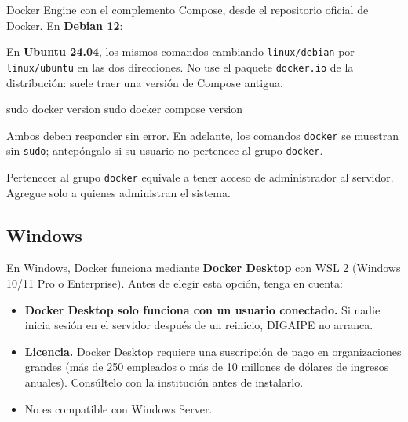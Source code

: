 Docker Engine con el complemento Compose, desde el repositorio oficial de Docker. En
\textbf{Debian 12}:


En \textbf{Ubuntu 24.04}, los mismos comandos cambiando \texttt{linux/debian} por
\texttt{linux/ubuntu} en las dos direcciones. No use el paquete \texttt{docker.io} de la
distribución: suele traer una versión de Compose antigua.

\begin{comprobar}
	\begin{codigo}
sudo docker version
sudo docker compose version
	\end{codigo}
	Ambos deben responder sin error. En adelante, los comandos \texttt{docker} se muestran sin
	\texttt{sudo}; antepóngalo si su usuario no pertenece al grupo \texttt{docker}.
\end{comprobar}

\begin{nota}
	Pertenecer al grupo \texttt{docker} equivale a tener acceso de administrador al servidor.
	Agregue solo a quienes administran el sistema.
\end{nota}

\subsection{Windows}
\label{sec:docker-windows}

En Windows, Docker funciona mediante \textbf{Docker Desktop} con WSL 2 (Windows 10/11 Pro o
Enterprise). Antes de elegir esta opción, tenga en cuenta:

\begin{itemize}
	\item \textbf{Docker Desktop solo funciona con un usuario conectado.} Si nadie inicia sesión
	      en el servidor después de un reinicio, DIGAIPE no arranca.
	\item \textbf{Licencia.} Docker Desktop requiere una suscripción de pago en organizaciones
	      grandes (más de 250 empleados o más de 10 millones de dólares de ingresos anuales).
	      Consúltelo con la institución antes de instalarlo.
	\item No es compatible con Windows Server.
\end{itemize}

